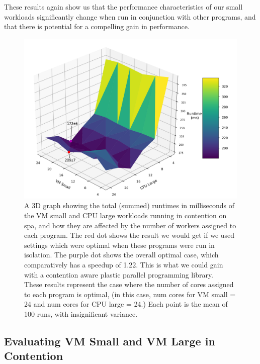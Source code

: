 These results again show us that the performance characteristics of our small workloads significantly change when run in conjunction with other programs, and that there is potential for a compelling gain in performance.



\begin{figure}[H]
    \includegraphics[width=1\textwidth]{graphics/contention/spa/otwc_vm_small_and_cpu_large.png}
    \caption{A 3D graph showing the total (summed) runtimes in milliseconds of the VM small and CPU large workloads running in contention on spa, and how they are affected by the number of workers assigned to each program. The red dot shows the result we would get if we used settings which were optimal when these programs were run in isolation. The purple dot shows the overall optimal case, which comparatively has a speedup of 1.22. This is what we could gain with a contention aware plastic parallel programming library. \\
    These results represent the case where the number of cores assigned to each program is optimal, (in this case, num cores for VM small = 24 and num cores for CPU large = 24.) Each point is the mean of 100 runs, with insignificant variance.}
    \label{fig:con_spa_vm_small_and_cpu_large}
\end{figure}



\subsection{Evaluating VM Small and VM Large in Contention}
\label{section:results:evaluating_vm_small_and_vm_large_in_contention}


